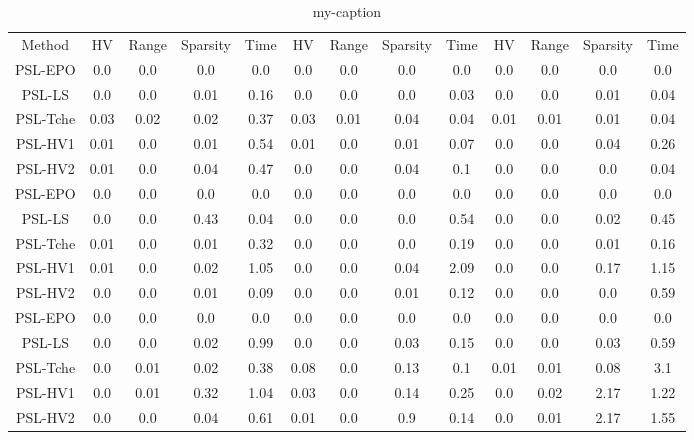 \begin{table}[]
\centering
\caption{my-caption}
\label{my-label}
\begin{tabular}{ccccccccccccc}
Method  &        HV  &    Range&     Sparsity&        Time&    HV  &    Range&     Sparsity&        Time&    HV  &    Range&     Sparsity&        Time\\
PSL-EPO &        0.0 &    0.0  &     0.0     &        0.0 &    0.0 &    0.0  &     0.0     &        0.0 &    0.0 &    0.0  &     0.0     &        0.0\\
PSL-LS  &        0.0 &    0.0  &     0.01    &        0.16&    0.0 &    0.0  &     0.0     &        0.03&    0.0 &    0.0  &     0.01    &        0.04\\
PSL-Tche&        0.03&    0.02 &     0.02    &        0.37&    0.03&    0.01 &     0.04    &        0.04&    0.01&    0.01 &     0.01    &        0.04\\
PSL-HV1 &        0.01&    0.0  &     0.01    &        0.54&    0.01&    0.0  &     0.01    &        0.07&    0.0 &    0.0  &     0.04    &        0.26\\
PSL-HV2 &        0.01&    0.0  &     0.04    &        0.47&    0.0 &    0.0  &     0.04    &        0.1 &    0.0 &    0.0  &     0.0     &        0.04\\
PSL-EPO &        0.0 &    0.0  &     0.0     &        0.0 &    0.0 &    0.0  &     0.0     &        0.0 &    0.0 &    0.0  &     0.0     &        0.0\\
PSL-LS  &        0.0 &    0.0  &     0.43    &        0.04&    0.0 &    0.0  &     0.0     &        0.54&    0.0 &    0.0  &     0.02    &        0.45\\
PSL-Tche&        0.01&    0.0  &     0.01    &        0.32&    0.0 &    0.0  &     0.0     &        0.19&    0.0 &    0.0  &     0.01    &        0.16\\
PSL-HV1 &        0.01&    0.0  &     0.02    &        1.05&    0.0 &    0.0  &     0.04    &        2.09&    0.0 &    0.0  &     0.17    &        1.15\\
PSL-HV2 &        0.0 &    0.0  &     0.01    &        0.09&    0.0 &    0.0  &     0.01    &        0.12&    0.0 &    0.0  &     0.0     &        0.59\\
PSL-EPO &        0.0 &    0.0  &     0.0     &        0.0 &    0.0 &    0.0  &     0.0     &        0.0 &    0.0 &    0.0  &     0.0     &        0.0\\
PSL-LS  &        0.0 &    0.0  &     0.02    &        0.99&    0.0 &    0.0  &     0.03    &        0.15&    0.0 &    0.0  &     0.03    &        0.59\\
PSL-Tche&        0.0 &    0.01 &     0.02    &        0.38&    0.08&    0.0  &     0.13    &        0.1 &    0.01&    0.01 &     0.08    &        3.1\\
PSL-HV1 &        0.0 &    0.01 &     0.32    &        1.04&    0.03&    0.0  &     0.14    &        0.25&    0.0 &    0.02 &     2.17    &        1.22\\
PSL-HV2 &        0.0 &    0.0  &     0.04    &        0.61&    0.01&    0.0  &     0.9     &        0.14&    0.0 &    0.01 &     2.17    &        1.55\\

\end{tabular}
\end{table}


